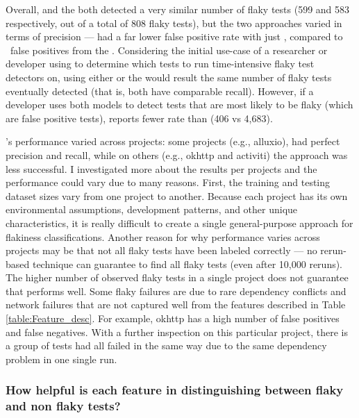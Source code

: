 Overall, \sysName and the \vocabName  both detected a very similar number of flaky tests (599 and 583 respectively, out of a total of 808 flaky tests), but the two approaches varied in terms of precision --- \sysName had a far lower false positive rate with just \flaggerfp, compared to \msrfp~false positives from the \vocabName. Considering the initial use-case of a researcher or developer using \sysName to determine which tests to run time-intensive flaky test detectors on, using either \sysName or the \vocabName would result the same number of flaky tests eventually detected (that is, both have comparable recall).
However, if a developer uses both models to detect tests that are most likely to be flaky (which are false positive tests), \sysName reports fewer rate than \vocabName (406 vs 4,683).

\sysName's performance varied across projects: some projects (e.g., alluxio), had perfect precision and recall, while on others (e.g., okhttp and activiti) the approach was less successful. I investigated more about the results per projects and the performance could vary due to many reasons. First, the training and testing dataset sizes vary from one project to another. Because each project has its own environmental assumptions, development patterns, and other unique characteristics, it is really difficult to create a single general-purpose approach for flakiness classifications. Another reason for why performance varies across projects may be that not all flaky tests have been labeled correctly --- no rerun-based technique can guarantee to find all flaky tests (even after 10,000 reruns). The higher number of observed flaky tests in a single project does not guarantee that \sysName performs well.
Some flaky failures are due to rare dependency conflicts and network failures that are not captured well from the features described in Table \ref{table:Feature_desc}.
For example, okhttp has a high number of false positives and false negatives. With a further inspection on this particular project, there is a group of tests had all failed in the same way due to the same dependency problem in one single run.





\subsubsection{How helpful is each feature in distinguishing between flaky and non flaky tests?}
\label{FlakeFlaggerRQ4}

